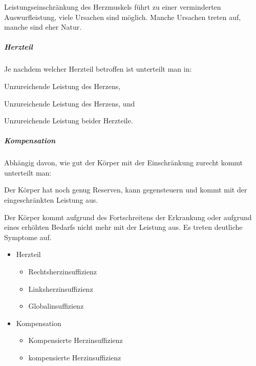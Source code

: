 
Leistungseinschränkung des Herzmuskels führt zu einer verminderten
Auswurfleistung, viele Ursachen sind möglich. Manche Ursachen treten
 auf, manche sind eher  Natur.



{
\subparagraph{Herzteil} 
Je nachdem welcher Herzteil betroffen ist unterteilt man in:

\begin{compactdesc}
  \item[\T{Rechtsherzinsuffizienz}] Unzureichende Leistung des 
  Herzens,
  \item[\T{Linksherzinsuffizienz}]
  Unzureichende Leistung des  Herzens, und
  \item[\T{Globalinsuffizienz}] Unzureichende Leistung beider Herzteile.
\end{compactdesc}

\subparagraph{Kompensation}
Abhängig davon, wie gut der Körper mit der
Einschränkung zurecht kommt unterteilt man:

\begin{compactdesc}
  \item[\T{Kompensierte Herzinsuffizienz}] Der Körper hat noch
  genug Reserven, kann gegensteuern und kommt mit der
  eingeschränkten Leistung aus.
  \item[\T{\E{De}kompensierte Herzinsuffizienz}] Der Körper kommt aufgrund
  des Fortschreitens der Erkrankung oder aufgrund eines erhöhten
  Bedarfs nicht mehr mit der Leistung aus. Es treten deutliche
  Symptome auf.
\end{compactdesc}
}{
\begin{itemize}
  \item Herzteil
  \begin{itemize}
    \item Rechtsherzinsuffizienz
    \item Linksherzinsuffizienz
    \item Globalinsuffizienz
  \end{itemize}
  \item Kompensation
  \begin{itemize}
    \item Kompensierte Herzinsuffizienz
    \item {}kompensierte Herzinsuffizienz
  \end{itemize}
\end{itemize}
}{}{}{}




